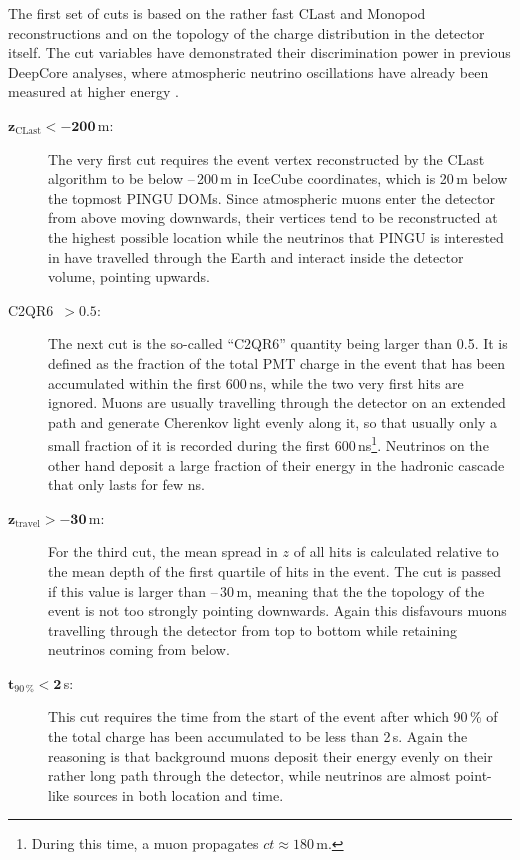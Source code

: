 The first set of cuts is based on the rather fast CLast and Monopod
reconstructions and on the topology of the charge distribution in the detector
itself. The cut variables have demonstrated their discrimination power in
previous DeepCore analyses, where atmospheric neutrino oscillations have already
been measured at higher energy \cite{DCosc}.

\begin{description}
 \item[$\mathbf{z_\mathrm{CLast} < -200}$\,m:] The very first cut requires the
  event vertex reconstructed by the CLast algorithm to be below --\,200\,m in
  IceCube coordinates, which is 20\,m below the topmost PINGU DOMs. Since
  atmospheric muons enter the detector from above moving downwards, their
  vertices tend to be reconstructed  at the highest possible location while the
  neutrinos that PINGU is interested  in have travelled through the Earth and
  interact inside the detector volume,  pointing upwards.

\item[C2QR6\ $\mathbf{>0.5}$:] The next cut is the so-called ``C2QR6'' quantity
  being  larger than 0.5. It is defined as the fraction of the total PMT charge
  in the  event that has been accumulated within the first 600\,ns, while the
  two very  first hits are ignored. Muons are usually travelling through the
  detector on  an extended path and generate Cherenkov light evenly along it, so
  that usually  only a small fraction of it is recorded during the first
  600\,ns\footnote{During this time, a muon propagates $ct\approx180$\,m.}.
  Neutrinos on the other hand deposit a large fraction of their energy in the
  hadronic cascade that only lasts for few ns.

\item[$\mathbf{z_\mathrm{travel} > -30}$\,m:] For the third cut, the mean spread
  in $z$  of all hits is calculated relative to the mean depth of the first
  quartile of  hits in the event. The cut is passed if this value is larger than
  --\,30\,m,  meaning that the the topology of the event is not too strongly
  pointing  downwards. Again this disfavours muons travelling through the
  detector from  top to bottom while retaining neutrinos coming from below.

\item[$\mathbf{t_\mathrm{90\,\%} < 2}$\,\textmu s:] This cut requires the
  time from  the start of the event after which 90\,\% of the total charge has
  been  accumulated to be less than 2\,\textmu s. Again the reasoning is that
  background muons deposit their energy evenly on their rather long path
  through the  detector, while neutrinos are almost point-like sources in both
  location and  time.


\end{description}
